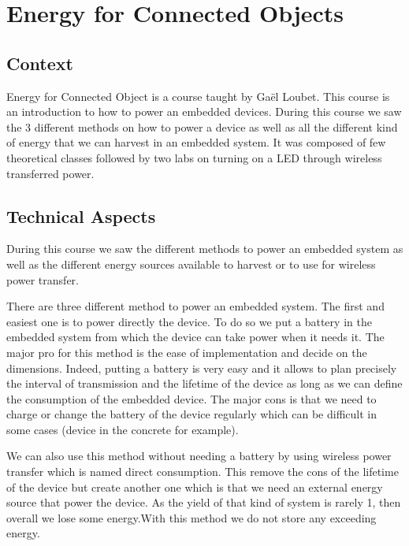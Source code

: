 \section{Energy for Connected Objects}

\subsection{Context}

Energy for Connected Object is a course taught by Gaël Loubet. This course is an introduction to how to power an embedded devices. During this course we saw the 3 different methods on how to power a device as well as all the different kind of energy that we can harvest in an embedded system. It was composed of few theoretical classes followed by two labs on turning on a LED through wireless transferred power.

\subsection{Technical Aspects}

During this course we saw the different methods to power an embedded system as well as the different energy sources available to harvest or to use for wireless power transfer.
\\\par

There are three different method to power an embedded system. The first and easiest one is to power directly the device. To do so we put a battery in the embedded system from which the device can take power when it needs it. The major pro for this method is the ease of implementation and decide on the dimensions. Indeed, putting a battery is very easy and it allows to plan precisely the interval of transmission and the lifetime of the device as long as we can define the consumption of the embedded device. The major cons is that we need to charge or change the battery of the device  regularly which can be difficult in some cases (device in the concrete for example).
\par 
We can also use this method without needing a battery by using wireless power transfer which is named direct consumption. This remove the cons of the lifetime of the device but create another one which is that we need an external energy source that power the device. As the yield of that kind of system is rarely 1, then overall we lose some energy.With this method we do not store any exceeding energy.
\\\par

